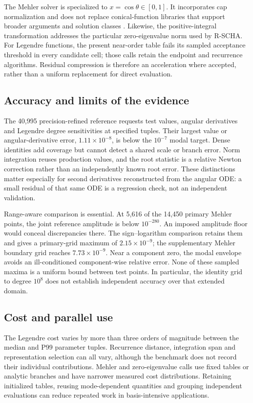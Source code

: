 ﻿\documentclass[11pt,a4paper]{article}
\newcommand{\RSCHA}{\textsc{R-SCHA}\xspace}
\begin{document}
The Mehler solver is specialized to $x=\cos\theta\in[0,1]$. It incorporates cap normalization and does not replace conical-function libraries that support broader arguments and solution classes \citep{GilEtAl2009,GilEtAl2012,DunsterEtAl2015}. Likewise, the positive-integral transformation addresses the particular zero-eigenvalue norm used by \RSCHA. For Legendre functions, the present near-order table fails its sampled acceptance threshold in every candidate cell; those calls retain the endpoint and recurrence algorithms. Residual compression is therefore an acceleration where accepted, rather than a uniform replacement for direct evaluation.

\subsection{Accuracy and limits of the evidence}

The 40,995 precision-refined reference requests test values, angular derivatives and Legendre degree sensitivities at specified tuples. Their largest value or angular-derivative error, $1.11\times10^{-8}$, is below the $10^{-7}$ modal target. Dense identities add coverage but cannot detect a shared scale or branch error. Norm integration reuses production values, and the root statistic is a relative Newton correction rather than an independently known root error. These distinctions matter especially for second derivatives reconstructed from the angular ODE: a small residual of that same ODE is a regression check, not an independent validation.

Range-aware comparison is essential. At 5,616 of the 14,450 primary Mehler points, the joint reference amplitude is below $10^{-280}$. An imposed amplitude floor would conceal discrepancies there. The sign--logarithm comparison retains them and gives a primary-grid maximum of $2.15\times10^{-9}$; the supplementary Mehler boundary grid reaches $7.73\times10^{-9}$. Near a component zero, the modal envelope avoids an ill-conditioned component-wise relative error. None of these sampled maxima is a uniform bound between test points. In particular, the identity grid to degree $10^8$ does not establish independent accuracy over that extended domain.

\subsection{Cost and parallel use}

The Legendre cost varies by more than three orders of magnitude between the median and P99 parameter tuples. Recurrence distance, integration span and representation selection can all vary, although the benchmark does not record their individual contributions. Mehler and zero-eigenvalue calls use fixed tables or analytic branches and have narrower measured cost distributions. Retaining initialized tables, reusing mode-dependent quantities and grouping independent evaluations can reduce repeated work in basis-intensive applications.
\end{document}
